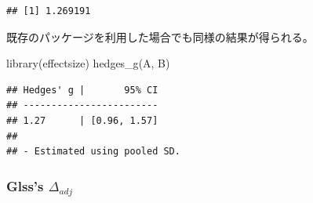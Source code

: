\documentclass[
  ja=standard, xelatex, base=12pt]{bxjsreport}
\newenvironment{Shaded}{\begin{snugshade}}{\end{snugshade}}
\newcommand{\CommentTok}[1]{\textcolor[rgb]{0.56,0.35,0.01}{\textit{#1}}}
\newcommand{\DecValTok}[1]{\textcolor[rgb]{0.00,0.00,0.81}{#1}}
\newcommand{\FunctionTok}[1]{\textcolor[rgb]{0.00,0.00,0.00}{#1}}
\newcommand{\NormalTok}[1]{#1}
\newcommand{\OtherTok}[1]{\textcolor[rgb]{0.56,0.35,0.01}{#1}}
\newcommand{\SpecialCharTok}[1]{\textcolor[rgb]{0.00,0.00,0.00}{#1}}
\begin{document}
\begin{Shaded}
\end{Shaded}

\begin{verbatim}
## [1] 1.269191
\end{verbatim}

既存のパッケージを利用した場合でも同様の結果が得られる。

\begin{Shaded}
\begin{Highlighting}[]
\FunctionTok{library}\NormalTok{(effectsize)}
\FunctionTok{hedges\_g}\NormalTok{(A, B)}
\end{Highlighting}
\end{Shaded}

\begin{verbatim}
## Hedges' g |       95% CI
## ------------------------
## 1.27      | [0.96, 1.57]
## 
## - Estimated using pooled SD.
\end{verbatim}

\hypertarget{glsss-delta_adj-1}{%
\subsubsection{\texorpdfstring{Glss's \(\Delta_{adj}\)}{Glss's \textbackslash Delta\_\{adj\}}}\label{glsss-delta_adj-1}}
\end{document}
